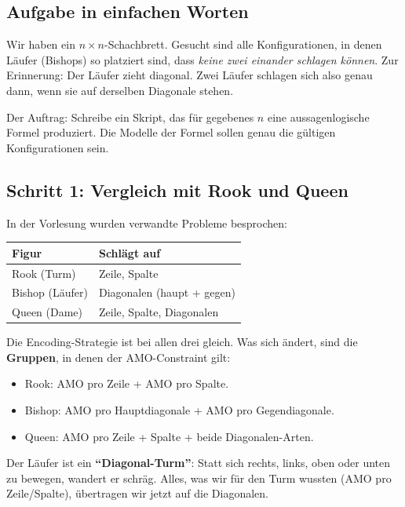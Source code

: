 \documentclass[a4paper,12pt]{article}
\begin{document}
\subsection*{Aufgabe in einfachen Worten}

Wir haben ein $n \times n$-Schachbrett. Gesucht sind alle
Konfigurationen, in denen L\"aufer (Bishops) so platziert sind, dass
\emph{keine zwei einander schlagen k\"onnen}. Zur Erinnerung: Der
L\"aufer zieht diagonal. Zwei L\"aufer schlagen sich also genau dann,
wenn sie auf derselben Diagonale stehen.

Der Auftrag: Schreibe ein Skript, das f\"ur gegebenes $n$ eine
aussagenlogische Formel produziert. Die Modelle der Formel sollen
genau die g\"ultigen Konfigurationen sein.

\subsection*{Schritt 1: Vergleich mit Rook und Queen}

In der Vorlesung wurden verwandte Probleme besprochen:

\begin{center}
\renewcommand{\arraystretch}{1.3}
\begin{tabular}{l|l}
\toprule
\textbf{Figur} & \textbf{Schl\"agt auf} \\
\midrule
Rook (Turm) & Zeile, Spalte \\
Bishop (L\"aufer) & Diagonalen (haupt + gegen) \\
Queen (Dame) & Zeile, Spalte, Diagonalen \\
\bottomrule
\end{tabular}
\end{center}

Die Encoding-Strategie ist bei allen drei gleich. Was sich \"andert,
sind die \textbf{Gruppen}, in denen der AMO-Constraint gilt:
\begin{itemize}[nosep]
\item Rook: AMO pro Zeile + AMO pro Spalte.
\item Bishop: AMO pro Hauptdiagonale + AMO pro Gegendiagonale.
\item Queen: AMO pro Zeile + Spalte + beide Diagonalen-Arten.
\end{itemize}

\begin{analogie}
Der L\"aufer ist ein \textbf{"`Diagonal-Turm"'}: Statt sich rechts,
links, oben oder unten zu bewegen, wandert er schr\"ag. Alles, was wir
f\"ur den Turm wussten (AMO pro Zeile/Spalte), \"ubertragen wir jetzt
auf die Diagonalen.
\end{analogie}
\end{document}
